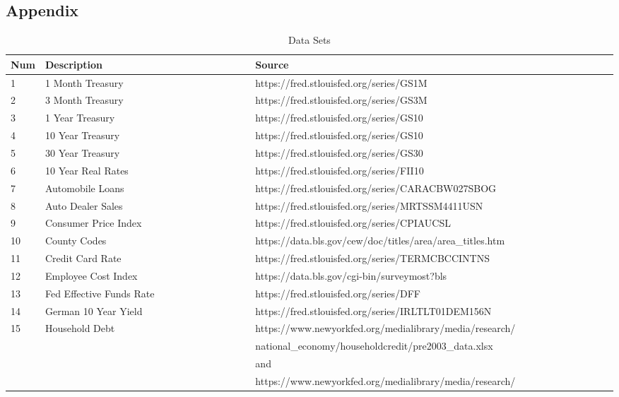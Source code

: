 \documentclass[sigconf,nonacm,11pt]{acmart}
\begin{document}
\appendix
\begin{appendix}

\section{Appendix}
\label{appendix:datasets}




\begin{table}[ht]
\caption{Data Sets}
\centering
\begin{tabular}{p{0.05\linewidth}p{0.35\linewidth}p{0.6\linewidth}}
\hline
Num & Description & Source\\
\hline
1 & 1 Month Treasury & https://fred.stlouisfed.org/series/GS1M\\
2 & 3 Month Treasury & https://fred.stlouisfed.org/series/GS3M\\
3 & 1 Year Treasury & https://fred.stlouisfed.org/series/GS10\\
4 & 10 Year Treasury & https://fred.stlouisfed.org/series/GS10\\
5 & 30 Year Treasury & https://fred.stlouisfed.org/series/GS30\\
6 & 10 Year Real Rates & https://fred.stlouisfed.org/series/FII10\\
7 & Automobile Loans & https://fred.stlouisfed.org/series/CARACBW027SBOG\\
8 & Auto Dealer Sales & https://fred.stlouisfed.org/series/MRTSSM4411USN\\
9 & Consumer Price Index & https://fred.stlouisfed.org/series/CPIAUCSL\\
10 & County Codes & https://data.bls.gov/cew/doc/titles/area/area_titles.htm\\
11 & Credit Card Rate & https://fred.stlouisfed.org/series/TERMCBCCINTNS\\
12 & Employee Cost Index & https://data.bls.gov/cgi-bin/surveymost?bls\\
13 & Fed Effective Funds Rate  & https://fred.stlouisfed.org/series/DFF\\
14 & German 10 Year Yield & https://fred.stlouisfed.org/series/IRLTLT01DEM156N\\
15 & Household Debt & https://www.newyorkfed.org/medialibrary/media/research/\\
 & & national\_economy/householdcredit/pre2003\_data.xlsx\\ 
 & & and\\
 & & https://www.newyorkfed.org/medialibrary/media/research/\\

\end{tabular}
\end{table}
\end{appendix}
\end{document}
